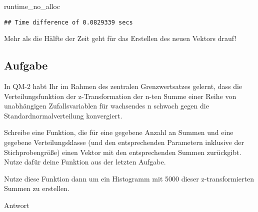 \documentclass[
]{book}
\newenvironment{Shaded}{\begin{snugshade}}{\end{snugshade}}
\newcommand{\NormalTok}[1]{#1}
\begin{document}
\begin{Shaded}
\begin{Highlighting}[]
\NormalTok{runtime\_no\_alloc}
\end{Highlighting}
\end{Shaded}

\begin{verbatim}
## Time difference of 0.0829339 secs
\end{verbatim}

Mehr als die Hälfte der Zeit geht für das Erstellen des neuen Vektors drauf!

\hypertarget{aufgabe-4}{%
\subsection{Aufgabe}\label{aufgabe-4}}

In QM-2 habt Ihr im Rahmen des zentralen Grenzwertsatzes gelernt, dass die Verteilungsfunktion der z-Transformation der n-ten Summe einer Reihe von unabhängigen Zufallsvariablen für wachsendes n schwach gegen die Standardnormalverteilung konvergiert.

Schreibe eine Funktion, die für eine gegebene Anzahl an Summen und eine gegebene Verteilungsklasse (und den entsprechenden Parametern inklusive der Stichprobengröße) einen Vektor mit den entsprechenden Summen zurückgibt.
Nutze dafür deine Funktion aus der letzten Aufgabe.

Nutze diese Funktion dann um ein Histogramm mit 5000 dieser z-transformierten Summen zu erstellen.

Antwort
\end{document}
